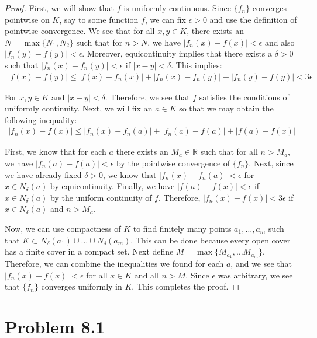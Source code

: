 \documentclass[psamsfonts]{amsart}
\theoremstyle{definition}
\theoremstyle{remark}
\numberwithin{equation}{section}
\begin{document}
\begin{proof}
First, we will show that $f$ is uniformly continuous. Since $\{ f_n \}$ converges pointwise on $K$, say to some function $f$, we can fix $\epsilon > 0$ and use the definition of pointwise convergence. We see that for all $x,y \in K$, there exists an $N = \max\{N_1, N_2 \}$ such that for $n > N$, we have $|f_n(x) - f(x)| < \epsilon$ and also $|f_n(y) - f(y)| < \epsilon$. Moreover, equicontinuity implies that there exists a $\delta > 0$ such that $|f_n(x) - f_n(y)| < \epsilon$ if $|x - y| < \delta$. This implies:
\begin{eqnarray}
|f(x) - f(y)| \leq |f(x) - f_n(x)| + |f_n(x) - f_n(y)| + |f_n(y) - f(y)| < 3 \epsilon
\end{eqnarray} 

For $x,y \in K$ and $| x - y| < \delta$. Therefore, we see that $f$ satisfies the conditions of uniformly continuity. Next, we will fix an $a \in K$ so that we may obtain the following inequality:
\begin{eqnarray}
|f_n(x) - f(x)| \leq |f_n(x) - f_n(a)| + |f_n(a) - f(a)| + |f(a) - f(x)|
\end{eqnarray}

First, we know that for each $a$ there exists an $M_a \in \mathbb{R}$ such that for all $n > M_a$, we have $|f_n(a) - f(a)| < \epsilon$ by the pointwise convergence of $\{ f_n \}$. Next, since we have already fixed $\delta > 0$, we know that $|f_n(x) - f_n(a)| < \epsilon$ for $x \in N_\delta(a)$ by equicontinuity. Finally, we have $|f(a) - f(x)| < \epsilon$ if $x \in N_\delta(a)$ by the uniform continuity of $f$. Therefore, $|f_n(x) - f(x)| < 3\epsilon$ if $x \in N_\delta(a)$ and $n > M_a$.

Now, we can use compactness of $K$ to find finitely many points $a_1, \ldots, a_m$ such that $K \subset N_\delta(a_1) \cup \ldots \cup N_\delta(a_m)$. This can be done because every open cover has a finite cover in a compact set. Next define $M = \max\{ M_{a_1}, \ldots M_{a_m} \}$. Therefore, we can combine the inequalities we found for each $a$, and we see that $|f_n(x) - f(x)| < \epsilon$ for all $x \in K$ and all $n > M$. Since $\epsilon$ was arbitrary, we see that $\{ f_n \}$ converges uniformly in $K$. This completes the proof.
\end{proof}

\section{Problem 8.1}
\end{document}
